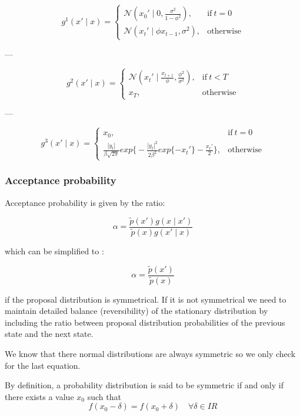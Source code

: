 \documentclass[]{article}
\begin{document}
	\begin{equation}
	g^1(x' \mid x)=
	\begin{cases}
	\mathcal{N}(x_0' \mid 0, \frac{\sigma^2}{1-\phi^2}), & \text{if}\ t=0 \\
	\mathcal{N}(x_t' \mid \phi x_{t-1}, \sigma^2) , & \text{otherwise}
	\end{cases}
	\end{equation}
	
	---
	
	\begin{equation}
	g^2(x' \mid x)=
	\begin{cases}
	\mathcal{N}(x_t' \mid \frac{x_{t+1}}{\phi}, \frac{\phi^2}{\sigma^2}), & \text{if}\ t<T \\
	x_T , & \text{otherwise}
	\end{cases}
	\end{equation}
	
	---
	
	\begin{equation}
	g^3(x' \mid x)=
	\begin{cases}
	x_0, & \text{if}\ t=0 \\
	\frac{|y_t|}{\beta \sqrt{2 \pi}} exp \bigg\{ -\frac{|y_t|^2}{2 \beta^2} exp\{-x_t' \} - \frac{x_t'}{2} \bigg\}, & \text{otherwise}
	\end{cases}
	\end{equation}
	
	
	\subsubsection*{Acceptance probability}
	
	Acceptance probability is given by the ratio:
	
	$$ \alpha = \frac{ \widetilde{p}(x')g(x \mid x') }{  \widetilde{p}(x)g(x' \mid x) }$$
	
	which can be simplified to :
	
	$$ \alpha = \frac{ \widetilde{p}(x')}{  \widetilde{p}(x) }$$
	
	if the proposal distribution is symmetrical. If it is not symmetrical we need to maintain detailed balance (reversibility) of the stationary distribution by including the ratio between proposal distribution probabilities of the previous state and the next state. 
	
	We know that there normal distributions are always symmetric so we only check for the last equation.
	
	By definition, a probability distribution is said to be symmetric if and only if there exists a value $x_0$ such that 
	$$ f(x_0 - \delta) = f(x_0 + \delta) \quad \forall \delta \in I\!R$$
	
\end{document}
